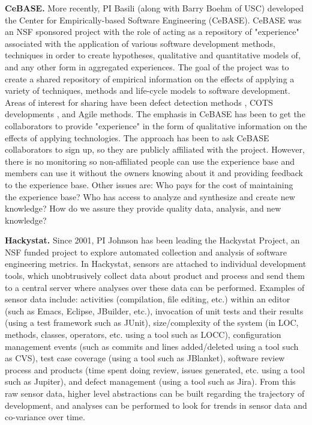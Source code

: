 {\bf CeBASE.} More recently, PI Basili (along with Barry Boehm of USC)
developed the Center for Empirically-based Software Engineering
(CeBASE). CeBASE was an NSF sponsored project with the role of acting as a
repository of "experience" associated with the application of various
software development methods, techniques in order to create hypotheses,
qualitative and quantitative models of, and any other form in aggregated
experiences. The goal of the project was to create a shared repository of
empirical information on the effects of applying a variety of techniques,
methods and life-cycle models to software development. Areas of interest
for sharing have been defect detection methods \cite{Boehm01}, COTS
developments \cite{Basili01}, and Agile methods. The emphasis in CeBASE
has been to get the collaborators to provide "experience" in the form of
qualitative information on the effects of applying technologies.  The
approach has been to ask CeBASE collaborators to sign up, so they are
publicly affiliated with the project. However, there is no monitoring so
non-affiliated people can use the experience base and members can use it
without the owners knowing about it and providing feedback to the
experience base. Other issues are: Who pays for the cost of maintaining the
experience base?  Who has access to analyze and synthesize and create new
knowledge?  How do we assure they provide quality data, analysis, and new
knowledge?

{\bf Hackystat.} Since 2001, PI Johnson has been leading the Hackystat
Project, an NSF funded project to explore automated collection and analysis
of software engineering metrics.  In Hackystat, sensors are attached to
individual development tools, which unobtrusively collect data about
product and process and send them to a central server where analyses over
these data can be performed.  Examples of sensor data include: activities
(compilation, file editing, etc.) within an editor (such as Emacs, Eclipse,
JBuilder, etc.), invocation of unit tests and their results (using a test
framework such as JUnit), size/complexity of the system (in LOC, methods,
classes, operators, etc. using a tool such as LOCC), configuration
management events (such as commits and lines added/deleted using a tool
such as CVS), test case coverage (using a tool such as JBlanket), software
review process and products (time spent doing review, issues generated,
etc. using a tool such as Jupiter), and defect management (using a tool
such as Jira).  From this raw sensor data, higher level abstractions can be
built regarding the trajectory of development, and analyses can be
performed to look for trends in sensor data and co-variance over time.

